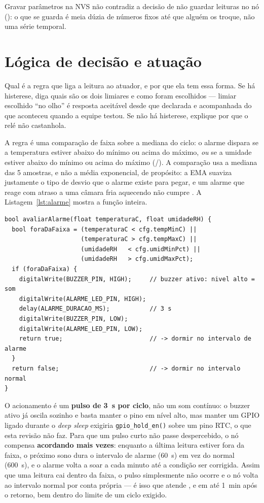 Gravar parâmetros na NVS não contradiz a decisão de não guardar
leituras no nó (): o que se guarda é meia
dúzia de números fixos até que alguém os troque, não uma série
temporal.

\section{Lógica de decisão e atuação}
\label{sec:decisao}

\begin{orientacao}
Qual é a regra que liga a leitura ao atuador, e por que ela tem essa
forma. Se há histerese, diga quais são os dois limiares e como foram
escolhidos --- limiar escolhido \enquote{no olho} é resposta aceitável
desde que declarada e acompanhada do que aconteceu quando a equipe
testou. Se não há histerese, explique por que o relé não castanhola.
\end{orientacao}

A regra é uma comparação de faixa sobre a mediana do ciclo: o alarme
dispara se a temperatura estiver abaixo do mínimo ou acima do máximo,
\emph{ou} se a umidade estiver abaixo do mínimo ou acima do máximo
(/). A comparação usa a mediana das 5 amostras, e não a
média exponencial, de propósito: a EMA suaviza justamente o tipo de
desvio que o alarme existe para pegar, e um alarme que reage com atraso
a uma câmara fria aquecendo não cumpre . A
Listagem~\ref{lst:alarme} mostra a função inteira.

\begin{lstlisting}[style=arduino,
  caption={Avaliação de faixa e acionamento do alarme local (buzzer + LED)},
  label={lst:alarme}]
bool avaliarAlarme(float temperaturaC, float umidadeRH) {
  bool foraDaFaixa = (temperaturaC < cfg.tempMinC) ||
                     (temperaturaC > cfg.tempMaxC) ||
                     (umidadeRH   < cfg.umidMinPct) ||
                     (umidadeRH   > cfg.umidMaxPct);
  if (foraDaFaixa) {
    digitalWrite(BUZZER_PIN, HIGH);     // buzzer ativo: nivel alto = som
    digitalWrite(ALARME_LED_PIN, HIGH);
    delay(ALARME_DURACAO_MS);           // 3 s
    digitalWrite(BUZZER_PIN, LOW);
    digitalWrite(ALARME_LED_PIN, LOW);
    return true;                        // -> dormir no intervalo de alarme
  }
  return false;                         // -> dormir no intervalo normal
}
\end{lstlisting}

O acionamento é um \textbf{pulso de \SI{3}{\second} por ciclo}, não um
som contínuo: o buzzer ativo já oscila sozinho e basta manter o pino em
nível alto, mas manter um GPIO ligado durante o \emph{deep sleep}
exigiria \texttt{gpio\_hold\_en()} sobre um pino RTC, o que esta
revisão não faz. Para que um pulso curto não passe despercebido, o nó
compensa \textbf{acordando mais vezes}: enquanto a última leitura
estiver fora da faixa, o próximo sono dura o intervalo de alarme
(\SI{60}{\second}) em vez do normal (\SI{600}{\second}), e o alarme
volta a soar a cada minuto até a condição ser corrigida. Assim que uma
leitura cai dentro da faixa, o pulso simplesmente não ocorre e o nó
volta ao intervalo normal por conta própria --- é isso que atende
, e em até \SI{1}{\minute} após o retorno, bem dentro do limite
de um ciclo exigido.

